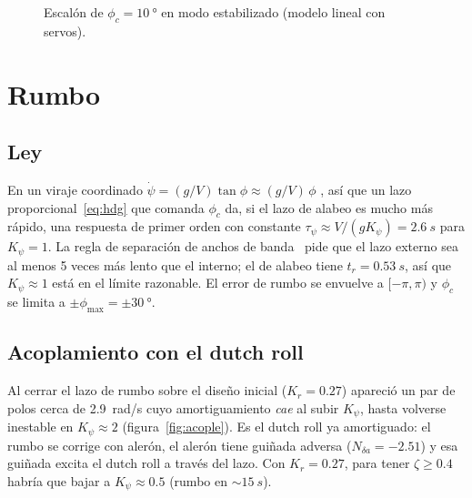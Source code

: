 \documentclass[11pt,a4paper]{article}
\begin{document}
\begin{figure}[htbp]
\centering
{}
\caption{Escalón de $\phi_c = \SI{10}{\degree}$ en modo estabilizado (modelo
lineal con servos).}
\label{fig:phi}
\end{figure}

\section{Rumbo}
\label{sec:rumbo}

\subsection{Ley}

En un viraje coordinado $\dot\psi = (g/V)\tan\phi \approx (g/V)\,\phi$
\cite{beard}, así que un lazo proporcional~\eqref{eq:hdg} que comanda $\phi_c$
da, si el lazo de alabeo es mucho más rápido, una respuesta de primer orden
con constante $\tau_\psi \approx V/(g K_\psi) = \SI{2.6}{s}$ para $K_\psi = 1$.
La regla de separación de anchos de banda~\cite{beard} pide que el lazo externo
sea al menos 5 veces más lento que el interno; el de alabeo tiene
$t_r = \SI{0.53}{s}$, así que $K_\psi \approx 1$ está en el límite razonable.
El error de rumbo se envuelve a $[-\pi, \pi)$ y $\phi_c$ se limita a
$\pm\phi_{\max} = \pm\SI{30}{\degree}$.

\subsection{Acoplamiento con el dutch roll}
\label{sec:acople}

Al cerrar el lazo de rumbo sobre el diseño inicial ($K_r = 0.27$) apareció un
par de polos cerca de \SI{2.9}{rad/s} cuyo amortiguamiento \emph{cae} al
subir $K_\psi$, hasta volverse inestable en $K_\psi \approx 2$
(figura~\ref{fig:acople}). Es el dutch roll ya amortiguado: el rumbo se
corrige con alerón, el alerón tiene guiñada adversa
($N_{\delta a} = -2.51$) y esa guiñada excita el dutch roll a través del
lazo. Con $K_r = 0.27$, para tener $\zeta \ge 0.4$ habría que bajar a
$K_\psi \approx 0.5$ (rumbo en $\sim\SI{15}{s}$).
\end{document}
